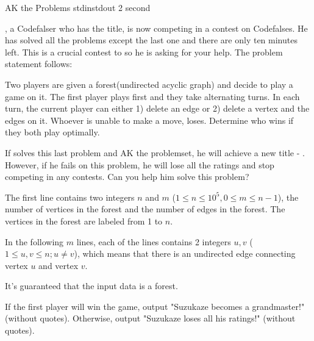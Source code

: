 
\begin{problem}{AK the Problems}
{stdin}{stdout}
{2 second}{}{}

\Suzukaze, a Codefalser who has the \master title, is now competing in a contest on Codefalses. He has solved all the problems except the last one and there are only ten minutes left. This is a crucial contest to \Suzukaze so he is asking for your help. The problem statement follows:

\par
Two players are given a forest(undirected acyclic graph) and decide to play a game on it. The first player plays first and they take alternating turns. In each turn, the current player can either 1) delete an edge or 2) delete a vertex and the edges on it. Whoever is unable to make a move, loses. Determine who wins if they both play optimally.

\par
If \Suzukaze  solves this last problem and AK the problemset, he will achieve a new title - \grandmaster. However, if he fails on this problem, he will lose all the ratings and stop competing in any contests. Can you help him solve this problem?

\InputFile

The first line contains two integers $n$ and $m$ ($1 \le n \le 10^5,0 \le m \le n-1 $), the number of vertices in the forest and the number of edges in the forest. The vertices in the forest are labeled from 1 to $n$.

In the following $m$ lines, each of the lines contains 2 integers $u, v$ ($1 \le u,v \le n; u \neq v$), which means that there is an undirected edge connecting vertex $u$ and vertex $v$.

It's guaranteed that the input data is a forest.

\OutputFile

If the first player will win the game, output "Suzukaze becomes a grandmaster!" (without quotes). Otherwise, output "Suzukaze loses all his ratings!" (without quotes).

\Examples

\begin{example}
%
\end{example}

\end{problem}

